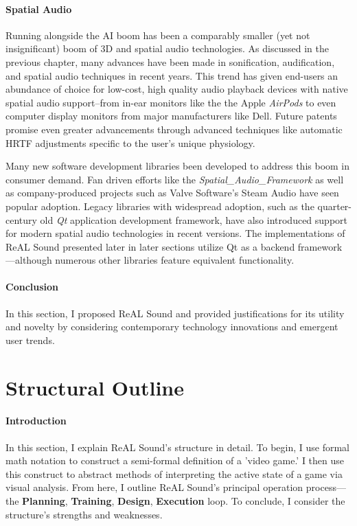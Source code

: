 \documentclass{report}
\newcommand{\rs}{ReAL Sound\xspace}
\newcommand{\plan}{\textbf{Planning}\xspace}
\newcommand{\train}{\textbf{Training}\xspace}
\newcommand{\design}{\textbf{Design}\xspace}
\newcommand{\exec}{\textbf{Execution}\xspace}
\begin{document}
\paragraph{Spatial Audio}
Running alongside the AI boom has been a comparably smaller (yet not insignificant) boom of 3D and spatial audio technologies. As discussed in the previous chapter, many advances have been made in sonification, audification, and spatial audio techniques in recent years. This trend has given end-users an abundance of choice for low-cost, high quality audio playback devices with native spatial audio support--from in-ear monitors like the the Apple \emph{AirPods}\cite{ApplePods} to even computer display monitors from major manufacturers like Dell\cite{Campbell_2025}. Future patents promise even greater advancements through advanced techniques like automatic HRTF adjustments specific to the user's unique physiology\cite{Antti2024}.


Many new software development libraries been developed to address this boom in consumer demand. Fan driven efforts like the \emph{Spatial\_Audio\_Framework}\cite{McCormack2024} as well as company-produced projects such as Valve Software's Steam Audio\cite{Valve} have seen popular adoption. Legacy libraries with widespread adoption, such as the quarter-century old \emph{Qt} application development framework\cite{QTProgramming}, have also introduced support for modern spatial audio technologies in recent versions\cite{QTSpatial}. The implementations of \rs presented later in later sections utilize Qt as a backend framework---although numerous other libraries feature equivalent functionality. 

\paragraph{Conclusion}
In this section, I proposed \rs and provided justifications for its utility and novelty by considering contemporary technology innovations and emergent user trends. 





\section{Structural Outline}
\paragraph{Introduction} 
In this section, I explain \rs's structure in detail. To begin, I use formal math notation to construct a semi-formal definition of a 'video game.' I then use this construct to abstract methods of interpreting the active state of a game via visual analysis. From here, I outline \rs's principal operation process---the \plan, \train, \design, \exec loop. To conclude, I consider the structure's strengths and weaknesses.        
\end{document}
